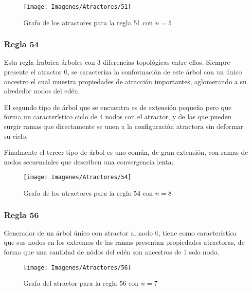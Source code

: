 \documentclass[]{article}
\begin{document}
				\hfill\break
				\hfill\break
				\begin{figure}[!h]
					\centering
					\texttt{[image: Imagenes/Atractores/51]}
					\caption{Grafo de los atractores para la regla 51 con $n=5$}
					\label{Regla_51}
				\end{figure}
				
			\newpage
			\subsubsection{Regla 54}
				\justifying
				Esta regla frabrica árboles con 3 diferencias topológicas entre ellos. Siempre presente el atractor 0, se caracteriza la conformación de este árbol con un único ancestro el cual muestra propiedades de atracción importantes, aglomerando a su alrededor nodos del edén.
				
				\hfill\break
				\justifying
				El segundo tipo de árbol que se encuentra es de extensión pequeña pero que forma un característico ciclo de 4 nodos con el atractor, y de las que pueden surgir ramas que directamente se unen a la configuración atractora sin deformar su ciclo.
				
				\hfill\break
				\justifying
				Finalmente el tercer tipo de árbol es uno común, de gran extensión, con ramas de nodos secuenciales que describen una convergencia lenta.
				
				\hfill\break
				\hfill\break
				\begin{figure}[!h]
					\centering
					\texttt{[image: Imagenes/Atractores/54]}
					\caption{Grafo de los atractores para la regla 54 con $n=8$}
					\label{Regla_54}
				\end{figure}
				
			\newpage
			\subsubsection{Regla 56}
				\justifying
				Generador de un árbol único con atractor al nodo 0, tiene como característica que sus nodos en los extremos de las ramas presentan propiedades atractoras, de forma que una cantidad de nódos del edén son ancestros de 1 solo nodo.
				
				\hfill\break
				\hfill\break
				\begin{figure}[!h]
					\centering
					\texttt{[image: Imagenes/Atractores/56]}
					\caption{Grafo del atractor para la regla 56 con $n=7$}
					\label{Regla_56}
				\end{figure}
				
\end{document}

